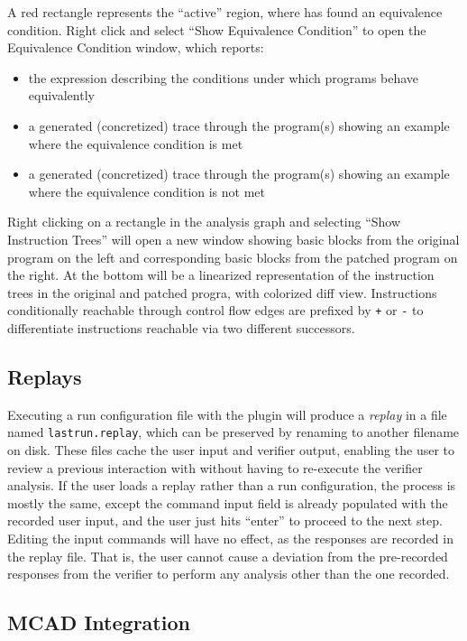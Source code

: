 A red rectangle represents the ``active'' region, where \pate{} has found an equivalence condition.
Right click and select ``Show Equivalence Condition'' to open the Equivalence Condition window, which reports:

\begin{itemize}
    \item the expression describing the conditions under which programs behave equivalently
    \item a generated (concretized) trace through the program(s) showing an example where the equivalence condition is met
    \item a generated (concretized) trace through the program(s) showing an example where the equivalence condition is not met
\end{itemize}

Right clicking on a rectangle in the \pate{} analysis graph and selecting ``Show Instruction Trees'' will open a new window showing basic blocks from the original program on the left and corresponding basic blocks from the patched program on the right.
At the bottom will be a linearized representation of the instruction trees in the original and patched progra, with colorized diff view.
Instructions conditionally reachable through control flow edges are prefixed by \texttt{+} or \texttt{-} to differentiate instructions reachable via two different successors.

\subsection{Replays}

Executing a run configuration file with the \pate{} plugin will produce a \emph{replay} in a file named \texttt{lastrun.replay}, which can be preserved by renaming to another filename on disk.
These files cache the user input and verifier output, enabling the user to review a previous interaction with \pate{} without having to re-execute the verifier analysis.
If the user loads a replay rather than a run configuration, the process is mostly the same, except the command input field is already populated with the recorded user input, and the user just hits ``enter'' to proceed to the next step.
Editing the input commands will have no effect, as the responses are recorded in the replay file.
That is, the user cannot cause a deviation from the pre-recorded responses from the \pate{} verifier to perform any analysis other than the one recorded.

\subsection{MCAD Integration}

